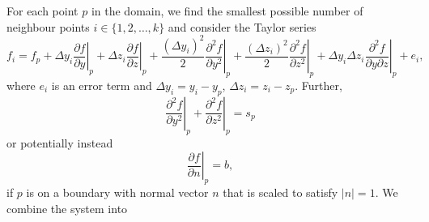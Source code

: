 \documentclass{article}
\begin{document}
For each point $p$ in the domain, we find the smallest possible number of neighbour points $i\in \{1,2,\ldots,k \}$ and consider the Taylor series
\begin{equation}
f_i = f_p 
+ \Delta y_i \left. \frac{\partial f}{\partial y} \right|_p
+ \Delta z_i \left. \frac{\partial f}{\partial z} \right|_p
+ \frac{(\Delta y_i)^2}{2} \left. \frac{\partial ^2f}{\partial y^2} \right|_p
+ \frac{(\Delta z_i)^2}{2} \left. \frac{\partial ^2f}{\partial z^2} \right|_p
+ \Delta y_i \Delta z_i \left. \frac{\partial ^2f}{\partial y \partial z} \right|_p
+ e_i,
\end{equation}
where $e_i$ is an error term and $\Delta y_i = y_i - y_p$, $\Delta z_i = z_i - z_p$. 
Further,
\begin{equation} \label{eq:poissonSolverRHSconditionAtp}
\left. \frac{\partial ^2f}{\partial y^2} \right|_p +  
\left. \frac{\partial ^2f}{\partial z^2} \right|_p = s_p
\end{equation}
or potentially instead
\begin{equation}
\left. \frac{\partial f}{\partial n} \right|_p = b,
\end{equation}
if $p$ is on a boundary with normal vector $n$ that is scaled to satisfy $|n|=1$.
We combine the system into
\end{document}
